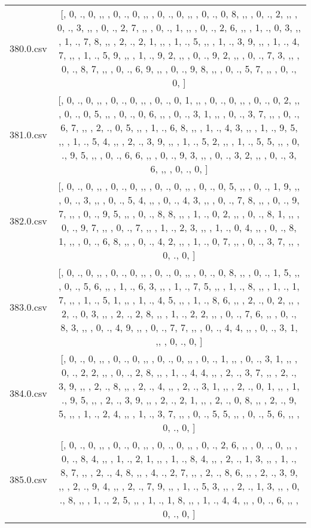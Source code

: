 \begin{table}[ht]
\begin{tabular}{@{}c c@{}}
	380.0.csv & [, 0, ., 0, ,,  , 0, ., 0, ,,  , 0, ., 0, ,,  , 0, ., 0, 8, ,,  , 0, ., 2, ,,  , 0, ., 3, ,,  , 0, ., 2, 7, ,,  , 0, ., 1, ,,  , 0, ., 2, 6, ,,  , 1, ., 0, 3, ,,  , 1, ., 7, 8, ,,  , 2, ., 2, 1, ,,  , 1, ., 5, ,,  , 1, ., 3, 9, ,,  , 1, ., 4, 7, ,,  , 1, ., 5, 9, ,,  , 1, ., 9, 2, ,,  , 0, ., 9, 2, ,,  , 0, ., 7, 3, ,,  , 0, ., 8, 7, ,,  , 0, ., 6, 9, ,,  , 0, ., 9, 8, ,,  , 0, ., 5, 7, ,,  , 0, ., 0, ]\\ 
	381.0.csv & [, 0, ., 0, ,,  , 0, ., 0, ,,  , 0, ., 0, 1, ,,  , 0, ., 0, ,,  , 0, ., 0, 2, ,,  , 0, ., 0, 5, ,,  , 0, ., 0, 6, ,,  , 0, ., 3, 1, ,,  , 0, ., 3, 7, ,,  , 0, ., 6, 7, ,,  , 2, ., 0, 5, ,,  , 1, ., 6, 8, ,,  , 1, ., 4, 3, ,,  , 1, ., 9, 5, ,,  , 1, ., 5, 4, ,,  , 2, ., 3, 9, ,,  , 1, ., 5, 2, ,,  , 1, ., 5, 5, ,,  , 0, ., 9, 5, ,,  , 0, ., 6, 6, ,,  , 0, ., 9, 3, ,,  , 0, ., 3, 2, ,,  , 0, ., 3, 6, ,,  , 0, ., 0, ]\\ 
	382.0.csv & [, 0, ., 0, ,,  , 0, ., 0, ,,  , 0, ., 0, ,,  , 0, ., 0, 5, ,,  , 0, ., 1, 9, ,,  , 0, ., 3, ,,  , 0, ., 5, 4, ,,  , 0, ., 4, 3, ,,  , 0, ., 7, 8, ,,  , 0, ., 9, 7, ,,  , 0, ., 9, 5, ,,  , 0, ., 8, 8, ,,  , 1, ., 0, 2, ,,  , 0, ., 8, 1, ,,  , 0, ., 9, 7, ,,  , 0, ., 7, ,,  , 1, ., 2, 3, ,,  , 1, ., 0, 4, ,,  , 0, ., 8, 1, ,,  , 0, ., 6, 8, ,,  , 0, ., 4, 2, ,,  , 1, ., 0, 7, ,,  , 0, ., 3, 7, ,,  , 0, ., 0, ]\\ 
	383.0.csv & [, 0, ., 0, ,,  , 0, ., 0, ,,  , 0, ., 0, ,,  , 0, ., 0, 8, ,,  , 0, ., 1, 5, ,,  , 0, ., 5, 6, ,,  , 1, ., 6, 3, ,,  , 1, ., 7, 5, ,,  , 1, ., 8, ,,  , 1, ., 1, 7, ,,  , 1, ., 5, 1, ,,  , 1, ., 4, 5, ,,  , 1, ., 8, 6, ,,  , 2, ., 0, 2, ,,  , 2, ., 0, 3, ,,  , 2, ., 2, 8, ,,  , 1, ., 2, 2, ,,  , 0, ., 7, 6, ,,  , 0, ., 8, 3, ,,  , 0, ., 4, 9, ,,  , 0, ., 7, 7, ,,  , 0, ., 4, 4, ,,  , 0, ., 3, 1, ,,  , 0, ., 0, ]\\ 
	384.0.csv & [, 0, ., 0, ,,  , 0, ., 0, ,,  , 0, ., 0, ,,  , 0, ., 1, ,,  , 0, ., 3, 1, ,,  , 0, ., 2, 2, ,,  , 0, ., 2, 8, ,,  , 1, ., 4, 4, ,,  , 2, ., 3, 7, ,,  , 2, ., 3, 9, ,,  , 2, ., 8, ,,  , 2, ., 4, ,,  , 2, ., 3, 1, ,,  , 2, ., 0, 1, ,,  , 1, ., 9, 5, ,,  , 2, ., 3, 9, ,,  , 2, ., 2, 1, ,,  , 2, ., 0, 8, ,,  , 2, ., 9, 5, ,,  , 1, ., 2, 4, ,,  , 1, ., 3, 7, ,,  , 0, ., 5, 5, ,,  , 0, ., 5, 6, ,,  , 0, ., 0, ]\\ 
	385.0.csv & [, 0, ., 0, ,,  , 0, ., 0, ,,  , 0, ., 0, ,,  , 0, ., 2, 6, ,,  , 0, ., 0, ,,  , 0, ., 8, 4, ,,  , 1, ., 2, 1, ,,  , 1, ., 8, 4, ,,  , 2, ., 1, 3, ,,  , 1, ., 8, 7, ,,  , 2, ., 4, 8, ,,  , 4, ., 2, 7, ,,  , 2, ., 8, 6, ,,  , 2, ., 3, 9, ,,  , 2, ., 9, 4, ,,  , 2, ., 7, 9, ,,  , 1, ., 5, 3, ,,  , 2, ., 1, 3, ,,  , 0, ., 8, ,,  , 1, ., 2, 5, ,,  , 1, ., 1, 8, ,,  , 1, ., 4, 4, ,,  , 0, ., 6, ,,  , 0, ., 0, ]\\ 

\end{tabular}
\end{table}
